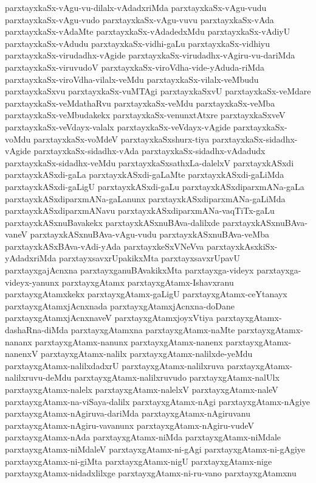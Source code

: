 {parxtayxkaSx-vAgu-vu-dilalx-vAdadxriMda
parxtayxkaSx-vAgu-vudu
parxtayxkaSx-vAgu-vudo
parxtayxkaSx-vAgu-vuvu
parxtayxkaSx-vAda
parxtayxkaSx-vAdaMte
parxtayxkaSx-vAdadedxMdu
parxtayxkaSx-vAdiyU
parxtayxkaSx-vAdudu
parxtayxkaSx-vidhi-gaLu
parxtayxkaSx-vidhiyu
parxtayxkaSx-virudadhx-vAgide
parxtayxkaSx-virudadhx-vAgiru-vu-dariMda
parxtayxkaSx-viruvudoV
parxtayxkaSx-viroVdha-vide-yAduda-riMda
parxtayxkaSx-viroVdha-vilalx-veMdu
parxtayxkaSx-vilalx-veMbudu
parxtayxkaSxvu
parxtayxkaSx-vuMTAgi
parxtayxkaSxvU
parxtayxkaSx-veMdare
parxtayxkaSx-veMdathaRvu
parxtayxkaSx-veMdu
parxtayxkaSx-veMba
parxtayxkaSx-veMbudakekx
parxtayxkaSx-venunxtAtxre
parxtayxkaSxveV
parxtayxkaSx-veVdayx-valalx
parxtayxkaSx-veVdayx-vAgide
parxtayxkaSx-voMdu
parxtayxkaSx-voMdeV
parxtayxkaSxshurx-tiya
parxtayxkaSx-sidadhx-vAgide
parxtayxkaSx-sidadhx-vAda
parxtayxkaSx-sidadhx-vAdadudx
parxtayxkaSx-sidadhx-veMdu
parxtayxkaSxsathxLa-dalelxV
parxtayxkASxdi
parxtayxkASxdi-gaLa
parxtayxkASxdi-gaLaMte
parxtayxkASxdi-gaLiMda
parxtayxkASxdi-gaLigU
parxtayxkASxdi-gaLu
parxtayxkASxdiparxmANa-gaLa
parxtayxkASxdiparxmANa-gaLanunx
parxtayxkASxdiparxmANa-gaLiMda
parxtayxkASxdiparxmANavu
parxtayxkASxdiparxmANa-vaqTiTx-gaLu
parxtayxkASxnuBavakekx
parxtayxkASxnuBAva-dalilxde
parxtayxkASxnuBAva-vaneV
parxtayxkASxnuBAva-vAgu-vudu
parxtayxkASxnuBAva-veMba
parxtayxkASxBAva-vAdi-yAda
parxtayxkeSxVNeVva
parxtayxkAsxkiSx-yAdadxriMda
parxtayxsavxrUpakikxMta
parxtayxsavxrUpavU
parxtayxgajAcnxna
parxtayxganuBAvakikxMta
parxtayxga-videyx
parxtayxga-videyx-yanunx
parxtayxgAtamx
parxtayxgAtamx-Ishavxranu
parxtayxgAtamxkekx
parxtayxgAtamx-gaLigU
parxtayxgAtamx-ceYtanayx
parxtayxgAtamxjAcnxnada
parxtayxgAtamxjAcnxna-doDane
parxtayxgAtamxjAcnxnaveV
parxtayxgAtamxjoyxVtiya
parxtayxgAtamx-dashaRna-diMda
parxtayxgAtamxna
parxtayxgAtamx-naMte
parxtayxgAtamx-nananx
parxtayxgAtamx-nanunx
parxtayxgAtamx-nanenx
parxtayxgAtamx-nanenxV
parxtayxgAtamx-nalilx
parxtayxgAtamx-nalilxde-yeMdu
parxtayxgAtamx-nalilxdadxrU
parxtayxgAtamx-nalilxruva
parxtayxgAtamx-nalilxruvu-deMdu
parxtayxgAtamx-nalilxruvudo
parxtayxgAtamx-nalUlx
parxtayxgAtamx-nalelx
parxtayxgAtamx-nalelxV
parxtayxgAtamx-naleV
parxtayxgAtamx-na-viSaya-dalilx
parxtayxgAtamx-nAgi
parxtayxgAtamx-nAgiye
parxtayxgAtamx-nAgiruva-dariMda
parxtayxgAtamx-nAgiruvanu
parxtayxgAtamx-nAgiru-vavanunx
parxtayxgAtamx-nAgiru-vudeV
parxtayxgAtamx-nAda
parxtayxgAtamx-niMda
parxtayxgAtamx-niMdale
parxtayxgAtamx-niMdaleV
parxtayxgAtamx-ni-gAgi
parxtayxgAtamx-ni-gAgiye
parxtayxgAtamx-ni-giMta
parxtayxgAtamx-nigU
parxtayxgAtamx-nige
parxtayxgAtamx-nidadxlilxge
parxtayxgAtamx-ni-ru-vano
parxtayxgAtamxnu
}
